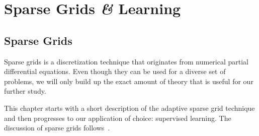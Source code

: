 \chapter{Sparse Grids \textit{\&} Learning}

\section{Sparse Grids}
Sparse grids is a discretization technique that originates from numerical partial differential equations.
Even though they can be used for a diverse set of problems, we will only build up the exact amount of theory that is useful for our further study.

This chapter starts with a short description of the adaptive sparse grid technique and then progresses to our application of choice: supervised learning.
The discussion of sparse grids follows~\cite{bungartzSparse,spatAdaptGrid,sparse-parsimony}.

